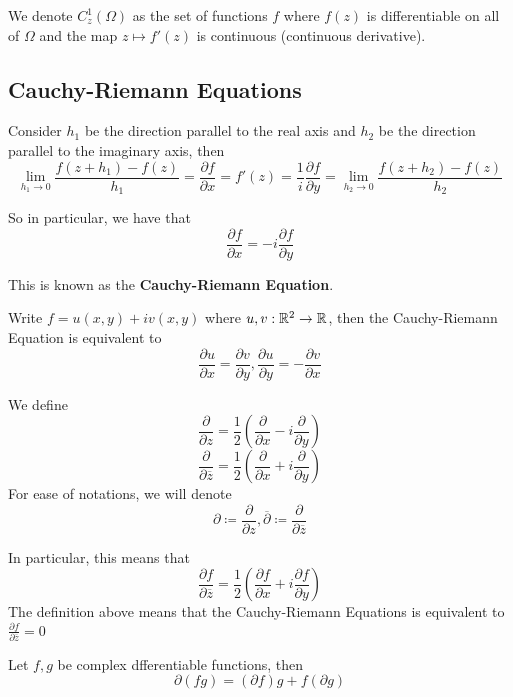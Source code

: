\begin{definition}
We denote $C^1_z(\Omega)$ as the set of functions $f$ where $f(z)$ is differentiable on all of $\Omega$ and the map $z \mapsto f'(z)$ is continuous (continuous derivative).
\end{definition}

\subsection{Cauchy-Riemann Equations}

Consider $h_1$ be the direction parallel to the real axis and $h_2$ be the direction parallel to the imaginary axis, then
\[\lim_{h_1 \to 0} \frac{f(z + h_1) - f(z)}{h_1} = \frac{\partial f}{\partial x} = f'(z) = \frac{1}{i} \frac{\partial f}{\partial y} = \lim_{h_2 \to 0} \frac{f(z + h_2) - f(z)}{h_2}\]

So in particular, we have that
\[\frac{\partial f}{\partial x} = -i \frac{\partial f}{\partial y}\]

This is known as the \textbf{Cauchy-Riemann Equation}.

\begin{remark}
    Write $f = u(x, y) + i v(x, y)$ where $u, v: \mathbb{R}^2 \to \mathbb{R}$, then the Cauchy-Riemann Equation is equivalent to
    \[\frac{\partial u}{\partial x} = \frac{\partial v}{\partial y}, \frac{\partial u}{\partial y} = -\frac{\partial v}{\partial x}\]
\end{remark}

\begin{definition}
We define
\[\frac{\partial}{\partial z} = \frac{1}{2}(\frac{\partial}{\partial x} - i \frac{\partial}{\partial y})\]
\[\frac{\partial}{\partial \overline{z}} = \frac{1}{2}(\frac{\partial}{\partial x} + i \frac{\partial}{\partial y})\]
For ease of notations, we will denote
\[\partial \coloneqq \frac{\partial}{\partial z}, \overline{\partial} \coloneqq \frac{\partial}{\partial \overline{z}}\]
\end{definition}

\begin{remark}
In particular, this means that
\[\frac{\partial f}{\partial \overline{z}} = \frac{1}{2}(\frac{\partial f}{\partial x} + i \frac{\partial f}{\partial y})\]
    The definition above means that the Cauchy-Riemann Equations is equivalent to $\frac{\partial f}{\partial \overline{z}} = 0$
\end{remark}

\begin{proposition}
    Let $f, g$ be complex dfferentiable functions, then
    \[\partial(f g) = (\partial f) g + f (\partial g)\]
\end{proposition}

